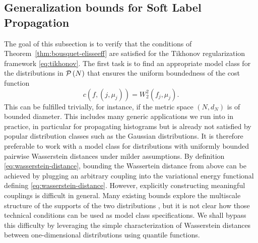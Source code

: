 \documentclass[letterpaper]{article} %
\begin{document}
\subsection{Generalization bounds for Soft Label Propagation} 
The goal of this subsection is to verify that the conditions of Theorem~\ref{thm:bousquet-elisseeff} are satisfied for the Tikhonov regularization framework \eqref{eq:tikhonov}.
The first task is to find an appropriate model class for the distributions in $\P\left( N \right)$ that ensures the uniform boundedness of the cost function
\begin{equation}
  \label{eq:wasserstein-cost-func}
    c\left( f, \left( j,\mu_j \right) \right)=W_2^2 \left( f_j,\mu_j \right).
\end{equation}
This can be fulfilled trivially, for instance, if the metric space $\left( N,d_N \right)$ is of bounded diameter.
This includes many generic applications we run into in practice, in particular for propagating histograms but is already not satisfied by popular distribution classes such as the Gaussian distributions. It is therefore preferable to work with a model class for distributions with uniformly bounded pairwise Wasserstein distances under milder assumptions. By definition \eqref{eq:wasserstein-distance}, bounding the Wassertein distance from above can be achieved by plugging an arbitrary coupling into the variational energy functional defining \eqref{eq:wasserstein-distance}. However, explicitly constructing meaningful couplings is difficult in general. Many existing bounds explore the multiscale structure of the supports of the two distributions \cite{David1988,Lei2018,SP2018}, but it is not clear how those technical conditions can be used as model class specifications. We shall bypass this difficulty by leveraging the simple characterization of Wasserstein distances between one-dimensional distributions using quantile functions.
\end{document}
